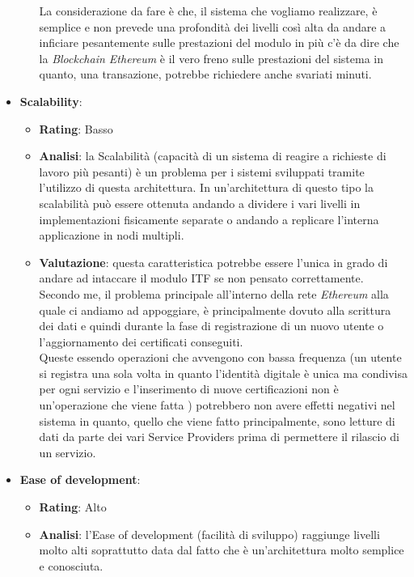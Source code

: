 \begin{itemize}
\begin{itemize}
		La considerazione da fare è che, il sistema che vogliamo realizzare, è semplice e non prevede una profondità dei livelli così alta da andare a inficiare pesantemente sulle prestazioni del modulo in più c'è da dire che la \textit{Blockchain Ethereum} è il vero freno sulle prestazioni del sistema in quanto, una transazione, potrebbe richiedere anche svariati minuti.
	\end{itemize}
	\item \textbf{Scalability}:
	\begin{itemize}
		\item \textbf{Rating}: Basso
		\item \textbf{Analisi}: la Scalabilità (capacità di un sistema di reagire a richieste di lavoro più pesanti) è un problema per i sistemi sviluppati tramite l'utilizzo di questa architettura. In un'architettura di questo tipo la scalabilità può essere ottenuta andando a dividere i vari livelli in implementazioni fisicamente separate o andando a replicare l'interna applicazione in nodi multipli\cite{3tierArch}\cite{3tierArch2}.
		\item \textbf{Valutazione}: questa caratteristica potrebbe essere l'unica in grado di andare ad intaccare il modulo \gls{ITF} se non pensato correttamente.\\
		Secondo me, il problema principale all'interno della rete \textit{Ethereum} alla quale ci andiamo ad appoggiare, è principalmente dovuto alla scrittura dei dati e quindi durante la fase di registrazione di un nuovo utente o l'aggiornamento dei certificati conseguiti.\\
		Queste essendo operazioni che avvengono con bassa frequenza (un utente si registra una sola volta in quanto l'identità digitale è unica ma condivisa per ogni servizio e l'inserimento di nuove certificazioni non è un'operazione che viene fatta ) potrebbero non avere effetti negativi nel sistema in quanto, quello che viene fatto principalmente, sono letture di dati da parte dei vari Service Providers prima di permettere il rilascio di un servizio.
	\end{itemize}
	\item \textbf{Ease of development}:
	\begin{itemize}
		\item \textbf{Rating}: Alto
		\item \textbf{Analisi}: l'Ease of development (facilità di sviluppo) raggiunge livelli molto alti soprattutto data dal fatto che è un'architettura molto semplice e conosciuta.\\

\end{itemize}
\end{itemize}
